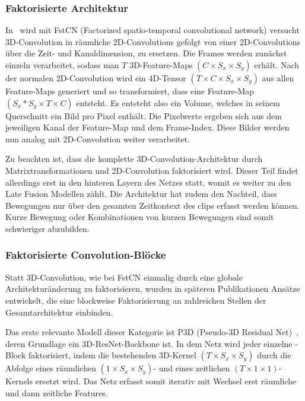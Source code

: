 \subsubsection{Faktorisierte Architektur}

In~\cite{Sun15} wird mit FstCN (Factorized spatio-temporal convolutional network) versucht 3D-Convolution in räumliche 2D-Convolutions gefolgt von einer 2D-Convolutions über die Zeit- und Kanaldimension, zu ersetzen.
Die Frames werden zunächst einzeln verarbeitet, sodass man ${T}$ 3D-Feature-Maps $(C \times S_x \times S_y)$ erhält.
Nach der normalen 2D-Convolution wird ein 4D-Tensor $(T \times C \times S_x \times S_y)$ aus allen Feature-Maps generiert und so transformiert, dass eine Feature-Map $(S_x * S_y \times T \times C)$ entsteht.
Es entsteht also ein Volume, welches in seinem Querschnitt ein Bild pro Pixel enthält.
Die Pixelwerte ergeben sich aus dem jeweiligen Kanal der Feature-Map und dem Frame-Index.
Diese Bilder werden nun analog mit 2D-Convolution weiter verarbeitet.

Zu beachten ist, dass die komplette 3D-Convolution-Architektur durch Matrixtransformationen und 2D-Convolution faktorisiert wird.
Dieser Teil findet allerdings erst in den hinteren Layern des Netzes statt, womit es weiter zu den Late Fusion Modellen zählt.
Die Architektur hat zudem den Nachteil, dass Bewegungen nur über den gesamten Zeitkontext des \glspl{clip} erfasst werden können.
Kurze Bewegung oder Kombinationen von kurzen Bewegungen sind somit schwieriger abzubilden.

\subsubsection{Faktorisierte Convolution-Blöcke}


Statt 3D-Convolution, wie bei FstCN einmalig durch eine globale Architekturänderung zu faktorisieren, wurden in späteren Publikationen Ansätze entwickelt, die eine blockweise Faktorisierung an zahlreichen Stellen der Gesamtarchitektur einbinden.

Das erste relevante Modell dieser Kategorie ist P3D (Pseudo-3D Residual Net)~\cite{Qiu17}, deren Grundlage ein 3D-ResNet-Backbone ist.
In dem Netz wird jeder einzelne \res-Block faktorisiert, indem die bestehenden 3D-Kernel $(T \times S_x \times S_y)$ durch die Abfolge eines räumlichen $(1 \times S_x \times S_y)$- und eines zeitlichen $(T \times 1 \times 1)$-Kernels ersetzt wird.
Das Netz erfasst somit iterativ mit Wechsel erst räumliche und dann zeitliche Features.

